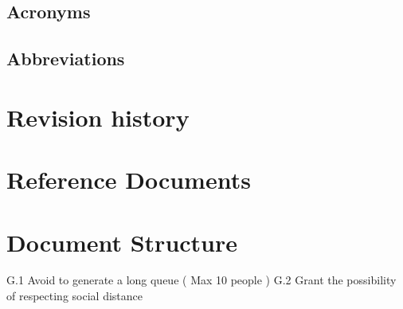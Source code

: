 \subsection{Acronyms}
\subsection{Abbreviations}

\section{Revision history}

\section{Reference Documents}

\section{Document Structure}
G.1 Avoid to generate a long queue ( Max 10 people )
G.2 Grant the possibility of respecting social distance
